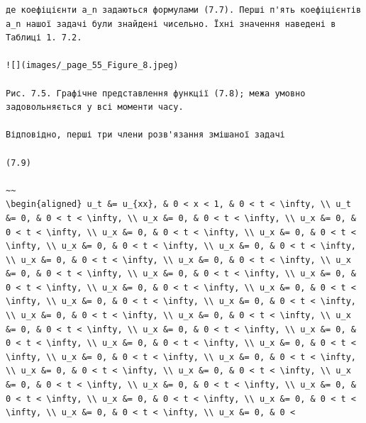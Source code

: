 \documentclass[
  ukrainian,
]{article}
\begin{document}
\begin{verbatim}
де коефіцієнти a_n задаються формулами (7.7). Перші п'ять коефіцієнтів a_n нашої задачі були знайдені чисельно. Їхні значення наведені в Таблиці 1. 7.2.

![](images/_page_55_Figure_8.jpeg)

Рис. 7.5. Графічне представлення функції (7.8); межа умовно задовольняється у всі моменти часу.

Відповідно, перші три члени розв'язання змішаної задачі

(7.9)

~~
\begin{aligned} u_t &= u_{xx}, & 0 < x < 1, & 0 < t < \infty, \\ u_t &= 0, & 0 < t < \infty, \\ u_x &= 0, & 0 < t < \infty, \\ u_x &= 0, & 0 < t < \infty, \\ u_x &= 0, & 0 < t < \infty, \\ u_x &= 0, & 0 < t < \infty, \\ u_x &= 0, & 0 < t < \infty, \\ u_x &= 0, & 0 < t < \infty, \\ u_x &= 0, & 0 < t < \infty, \\ u_x &= 0, & 0 < t < \infty, \\ u_x &= 0, & 0 < t < \infty, \\ u_x &= 0, & 0 < t < \infty, \\ u_x &= 0, & 0 < t < \infty, \\ u_x &= 0, & 0 < t < \infty, \\ u_x &= 0, & 0 < t < \infty, \\ u_x &= 0, & 0 < t < \infty, \\ u_x &= 0, & 0 < t < \infty, \\ u_x &= 0, & 0 < t < \infty, \\ u_x &= 0, & 0 < t < \infty, \\ u_x &= 0, & 0 < t < \infty, \\ u_x &= 0, & 0 < t < \infty, \\ u_x &= 0, & 0 < t < \infty, \\ u_x &= 0, & 0 < t < \infty, \\ u_x &= 0, & 0 < t < \infty, \\ u_x &= 0, & 0 < t < \infty, \\ u_x &= 0, & 0 < t < \infty, \\ u_x &= 0, & 0 < t < \infty, \\ u_x &= 0, & 0 < t < \infty, \\ u_x &= 0, & 0 < t < \infty, \\ u_x &= 0, & 0 < t < \infty, \\ u_x &= 0, & 0 < t < \infty, \\ u_x &= 0, & 0 < t < \infty, \\ u_x &= 0, & 0 < t < \infty, \\ u_x &= 0, & 0 < t < \infty, \\ u_x &= 0, & 0 < 
\end{verbatim}
\end{document}
